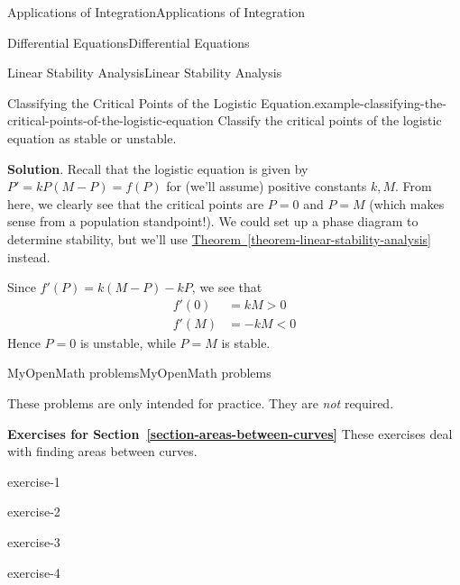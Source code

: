 \documentclass[10pt,]{book}
\numberwithin{equation}{section}
\newcommand{\lt}{<}
\newcommand{\gt}{>}
\begin{document}
\begin{chapterptx}{Applications of Integration}{}{Applications of Integration}{}{}
\begin{sectionptx}{Differential Equations}{}{Differential Equations}{}{}
\begin{subsectionptx}{Linear Stability Analysis}{}{Linear Stability Analysis}{}{}
\begin{example}{Classifying the Critical Points of the Logistic Equation.}{example-classifying-the-critical-points-of-the-logistic-equation}
\hypertarget{p-772}{}%
Classify the critical points of the logistic equation as stable or unstable.%
\par\smallskip%
\noindent\textbf{Solution}.\hypertarget{solution-161}{}\quad%
\hypertarget{p-773}{}%
Recall that the logistic equation is given by \(P' = kP(M-P) = f(P)\) for (we'll assume) positive constants \(k,M\). From here, we clearly see that the critical points are \(P = 0\) and \(P = M\) (which makes sense from a population standpoint!). We could set up a phase diagram to determine stability, but we'll use \hyperref[theorem-linear-stability-analysis]{Theorem~\ref{theorem-linear-stability-analysis}} instead.%
\par
\hypertarget{p-774}{}%
Since \(f'(P) = k(M-P) - kP\), we see that%
\begin{align*}
f'(0) & = kM \gt 0\\
f'(M) & = -kM \lt 0 
\end{align*}
Hence \(P = 0\) is unstable, while \(P = M\) is stable.%
\end{example}
\end{subsectionptx}
\end{sectionptx}
%
%
\typeout{************************************************}
\typeout{************************************************}
%
\begin{exercises-section}{MyOpenMath problems}{}{MyOpenMath problems}{}{}\hypertarget{exercises-1}{}
\begin{introduction}{}%
\hypertarget{p-775}{}%
These problems are only intended for practice. They are \emph{not} required.%
\end{introduction}%
\par\medskip\noindent%
\textbf{Exercises for Section~\ref*{section-areas-between-curves}}\space\space\hypertarget{exercisegroup-1}{}%
\hypertarget{p-776}{}%
These exercises deal with finding areas between curves.%
\begin{exercisegroup}{1}
\begin{divisionexercise}{1}{}{}{exercise-1}%
\end{divisionexercise}%
\begin{divisionexercise}{2}{}{}{exercise-2}%
\end{divisionexercise}%
\begin{divisionexercise}{3}{}{}{exercise-3}%
\end{divisionexercise}%
\begin{divisionexercise}{4}{}{}{exercise-4}%
\end{divisionexercise}%

\end{exercisegroup}
\end{exercises-section}
\end{chapterptx}
\end{document}
